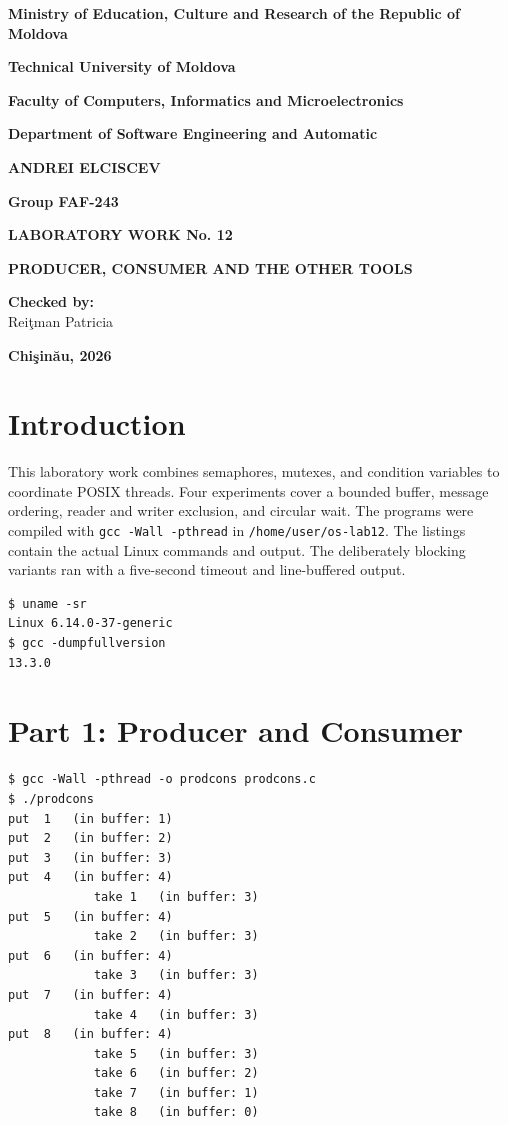 \documentclass[12pt,a4paper]{article}
\begin{document}
\begin{titlepage}
\centering
\textbf{Ministry of Education, Culture and Research of the Republic of Moldova}\par\medskip
\textbf{Technical University of Moldova}\par\medskip
\textbf{Faculty of Computers, Informatics and Microelectronics}\par\medskip
\textbf{Department of Software Engineering and Automatic}\par
\vspace{2.5cm}
\textbf{ANDREI ELCISCEV}\par
\textbf{Group FAF-243}\par
\vspace{2cm}
{\Large\textbf{LABORATORY WORK No. 12}\par}
\medskip
{\Large\textbf{PRODUCER, CONSUMER AND THE OTHER TOOLS}\par}
\vspace{2cm}
\begin{flushright}
\textbf{Checked by:}\\
Rei\c{t}man Patricia
\end{flushright}
\vfill
\textbf{Chi\c{s}in\u{a}u, 2026}
\end{titlepage}
\tableofcontents
\newpage
\section{Introduction}
This laboratory work combines semaphores, mutexes, and condition variables to
coordinate POSIX threads. Four experiments cover a bounded buffer, message
ordering, reader and writer exclusion, and circular wait. The programs were
compiled with \texttt{gcc -Wall -pthread} in \texttt{/home/user/os-lab12}.
The listings contain the actual Linux commands and output. The deliberately
blocking variants ran with a five-second timeout and line-buffered output.

\begin{lstlisting}[caption={Linux VM and compiler}]
$ uname -sr
Linux 6.14.0-37-generic
$ gcc -dumpfullversion
13.3.0
\end{lstlisting}

\section{Part 1: Producer and Consumer}

\begin{lstlisting}[caption={Four-slot buffer with eight items}]
$ gcc -Wall -pthread -o prodcons prodcons.c
$ ./prodcons
put  1   (in buffer: 1)
put  2   (in buffer: 2)
put  3   (in buffer: 3)
put  4   (in buffer: 4)
            take 1   (in buffer: 3)
put  5   (in buffer: 4)
            take 2   (in buffer: 3)
put  6   (in buffer: 4)
            take 3   (in buffer: 3)
put  7   (in buffer: 4)
            take 4   (in buffer: 3)
put  8   (in buffer: 4)
            take 5   (in buffer: 3)
            take 6   (in buffer: 2)
            take 7   (in buffer: 1)
            take 8   (in buffer: 0)
\end{lstlisting}
\end{document}
